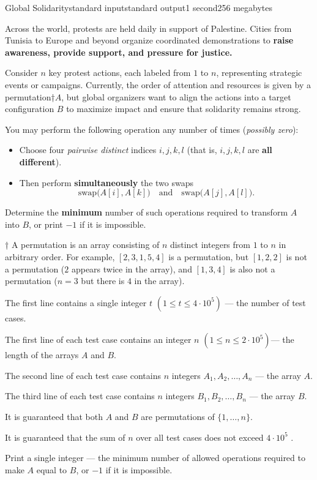 \begin{problem}{Global Solidarity}{standard input}{standard output}{1 second}{256 megabytes}

Across the world, protests are held daily in support of Palestine. Cities from Tunisia to Europe and beyond organize coordinated demonstrations to \textbf{raise awareness, provide support, and pressure for justice.}

Consider $n$ key protest actions, each labeled from $1$ to $n$, representing strategic events or campaigns. Currently, the order of attention and resources is given by a permutation†$A$, but global organizers want to align the actions into a target configuration $B$ to maximize impact and ensure that solidarity remains strong.

You may perform the following operation any number of times (\emph{possibly zero}):

\begin{itemize}
  \item Choose four \emph{pairwise distinct} indices $i,j,k,l$ (that is, $i,j,k,l$ are \textbf{all different}).
  \item Then perform \textbf{simultaneously} the two swaps
    $$\text{swap}\bigl(A[i],A[k]\bigr)\quad\text{and}\quad \text{swap}\bigl(A[j],A[l]\bigr).$$
\end{itemize}

Determine the \textbf{minimum} number of such operations required to transform $A$ into $B$, or print $-1$ if it is impossible.

†
 A permutation is an array consisting of $n$ distinct integers from $1$ to $n$ in arbitrary order. For example, $[2,3,1,5,4]$ is a permutation, but $[1,2,2]$ is not a permutation ($2$ appears twice in the array), and $[1,3,4]$ is also not a permutation ($n=3$ but there is $4$ in the array).

\InputFile
The first line contains a single integer $t$ $(1 \le t \le 4\cdot 10^5)$ --- the number of test cases.

The first line of each test case contains an integer $n$ $(1 \le n \le 2\cdot 10^5)$--- the length of the arrays $A$ and $B$.

The second line of each test case contains $n$ integers $A_1,A_2,\dots,A_n$ --- the array $A$.

The third line of each test case contains $n$ integers $B_1,B_2,\dots,B_n$ --- the array $B$.

It is guaranteed that both $A$ and $B$ are permutations of $\{1,\dots,n\}$.

It is guaranteed that the sum of $n$ over all test cases does not exceed $4\cdot 10^5$ .

\OutputFile
Print a single integer --- the minimum number of allowed operations required to make $A$ equal to $B$, or $-1$ if it is impossible.

\Example

\begin{example}
%
\end{example}

\end{problem}

